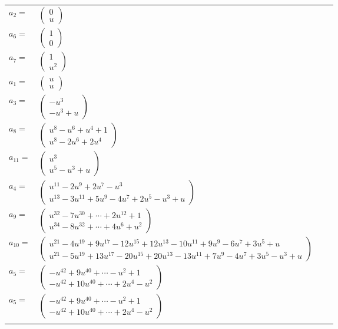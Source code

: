 \documentclass[1p]{elsarticle_modified}
\theoremstyle{definition}
\begin{document}
\begin{tabular}{m{7pt} m{180pt} m{7pt} m{180pt} }
\flushright $a_{2}=$&$\begin{pmatrix}0\\u\end{pmatrix}$ \\
\flushright $a_{6}=$&$\begin{pmatrix}1\\0\end{pmatrix}$ \\
\flushright $a_{7}=$&$\begin{pmatrix}1\\u^2\end{pmatrix}$ \\
\flushright $a_{1}=$&$\begin{pmatrix}u\\u\end{pmatrix}$ \\
\flushright $a_{3}=$&$\begin{pmatrix}- u^3\\- u^3+u\end{pmatrix}$ \\
\flushright $a_{8}=$&$\begin{pmatrix}u^8- u^6+u^4+1\\u^8-2 u^6+2 u^4\end{pmatrix}$ \\
\flushright $a_{11}=$&$\begin{pmatrix}u^3\\u^5- u^3+u\end{pmatrix}$ \\
\flushright $a_{4}=$&$\begin{pmatrix}u^{11}-2 u^9+2 u^7- u^3\\u^{13}-3 u^{11}+5 u^9-4 u^7+2 u^5- u^3+u\end{pmatrix}$ \\
\flushright $a_{9}=$&$\begin{pmatrix}u^{32}-7 u^{30}+\cdots+2 u^{12}+1\\u^{34}-8 u^{32}+\cdots+4 u^6+u^2\end{pmatrix}$ \\
\flushright $a_{10}=$&$\begin{pmatrix}u^{21}-4 u^{19}+9 u^{17}-12 u^{15}+12 u^{13}-10 u^{11}+9 u^9-6 u^7+3 u^5+u\\u^{21}-5 u^{19}+13 u^{17}-20 u^{15}+20 u^{13}-13 u^{11}+7 u^9-4 u^7+3 u^5- u^3+u\end{pmatrix}$ \\
\flushright $a_{5}=$&$\begin{pmatrix}- u^{42}+9 u^{40}+\cdots- u^2+1\\- u^{42}+10 u^{40}+\cdots+2 u^4- u^2\end{pmatrix}$\\ \flushright $a_{5}=$&$\begin{pmatrix}- u^{42}+9 u^{40}+\cdots- u^2+1\\- u^{42}+10 u^{40}+\cdots+2 u^4- u^2\end{pmatrix}$\\&\end{tabular}
\end{document}
